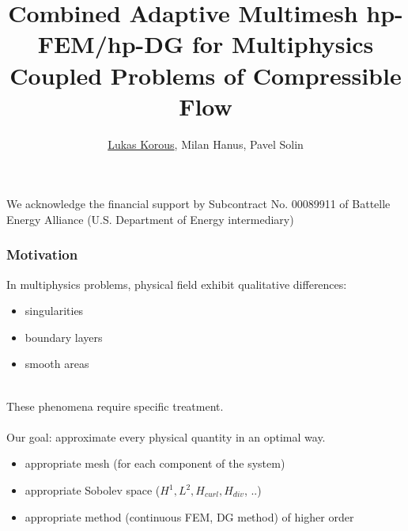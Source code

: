 \documentclass{beamer}
\title{Combined Adaptive Multimesh hp-FEM/hp-DG for Multiphysics Coupled Problems of Compressible Flow}
\author{\underline{Lukas Korous}, Milan Hanus, Pavel Solin}
\institute{University of Nevada, Reno}
\begin{document}
\begin{frame}
\titlepage
\end{frame}

\begin{frame}
We acknowledge the financial support by Subcontract No. 00089911 
of Battelle Energy Alliance (U.S. Department of Energy intermediary) 
\end{frame}

\begin{frame}
\frametitle{Motivation}
In multiphysics problems, physical field exhibit qualitative differences:\\
\begin{itemize}
\item singularities
\item boundary layers
\item smooth areas
\end{itemize}\ \\
These phenomena require specific treatment.\\\ \\
Our goal: approximate every physical quantity in an optimal way.\\
\begin{itemize}
\item appropriate mesh (for each component of the system)
\item appropriate Sobolev space ($H^1, L^2, H_{curl}, H_{div}$, ..)
\item appropriate method (continuous FEM, DG method) of higher order
\end{itemize}
\end{frame}


\end{document}
